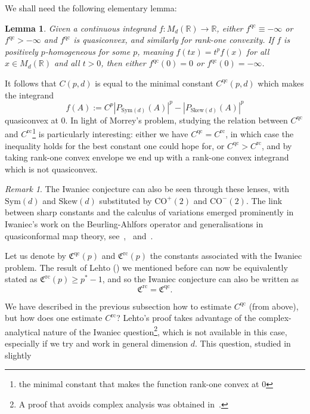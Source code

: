 \documentclass[11pt, a4paper]{amsart}
\newtheorem{lemma}[theorem]{Lemma}
\theoremstyle{definition}
\theoremstyle{remark}
\newtheorem{remark}{Remark}
\newcommand{\R}{\mathbb{R}}
\begin{document}
We shall need the following elementary lemma:
\begin{lemma}
    Given a continuous integrand
    $f\colon M_d(\R)\to \R$, either
$f^{\mathrm{qc}}\equiv-\infty$ or 
$f^{\mathrm{qc}}>-\infty$ and 
$f^{\mathrm{qc}}$ is quasiconvex, 
and similarly for rank-one convexity.
If $f$ is positively $p$-homogeneous for some $p$, meaning
$f(tx)=t^p f(x)$ for all $x\in M_d(\R)$ and all $t>0$, then either
$f^{\mathrm{qc}}(0)=0$ or $f^{\mathrm{qc}}(0)=-\infty$.
\end{lemma}
It follows that $C(p,d)$ is equal
to the minimal constant
$C^{\mathrm{qc}}(p,d)$ which makes the integrand
\[
f(A):=C^p|P_{\mathrm{Sym}(d)}(A)|^p-
|P_{\mathrm{Skew}(d)}(A)|^p\]
quasiconvex at $0$. In light of Morrey's problem,
studying the relation between $C^{\mathrm{qc}}$
and $C^{\mathrm{rc}}$\footnote{the minimal constant that
makes the function rank-one convex at $0$}
is particularly interesting: either we have 
$C^{\mathrm{qc}}=C^{\mathrm{rc}}$, in which case
the inequality holds for the best constant
one could hope for,
or $C^{\mathrm{qc}}>C^{\mathrm{rc}}$, and by taking
rank-one convex envelope
we end up with a rank-one convex integrand
which is not quasiconvex.
\begin{remark}
The Iwaniec conjecture can also be seen
through these lenses,
with $\mathrm{Sym}(d)$ and $\mathrm{Skew}(d)$
substituted by $\mathrm{CO}^+(2)$ and
$\mathrm{CO}^-(2)$.
The link between sharp constants
and the calculus of variations
emerged prominently in Iwaniec's work
on the Beurling-Ahlfors operator
and generalisations in quasiconformal map theory,
see~\cite{Iwaniec2002Nonlinear},~\cite{Iwaniec1982}
and~\cite{Iwaniec1982OnExponents}.\par Let us denote by 
$\mathfrak C^{\mathrm{qc}}(p)$
and $\mathfrak C^{\mathrm{rc}}(p)$
the constants associated
with the Iwaniec problem.
The result of Lehto (\cite{Lehto_1966})
we mentioned before can now be
equivalently stated as
$\mathfrak C^{\mathrm{rc}}(p)\ge p^*-1$,
and so the Iwaniec conjecture
can also be written as
\[\mathfrak{C}^{\mathrm{rc}}=
\mathfrak{C}^{\mathrm{qc}}.\]
\end{remark}
We have described in the previous subsection how 
to estimate $C^{\mathrm{qc}}$ (from above),
but how does one
estimate $C^{\mathrm{rc}}$? Lehto's proof 
takes advantage of the complex-analytical nature of the
Iwaniec question\footnote{A proof that avoids
complex analysis
was obtained in~\cite{boros2011}.},
which is not available in this case,
especially if we try and work in general dimension $d$.
This question, studied in slightly
\end{document}
